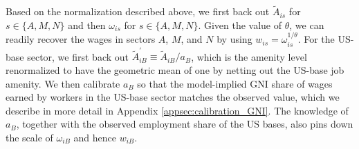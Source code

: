 \documentclass[12pt, unicode, a4paper]{article}
\newcommand{\1}{\mbox{1}\hspace{-0.25em}\mbox{l}} %
\begin{document}
Based on the normalization described above, we first back out $\widetilde{A}_{is}$ for $s \in \{ A,M,N \}$ and then $\omega_{is}$ for $s \in \{ A,M,N \}$. Given the value of $\theta$, we can readily recover the wages in sectors $A$, $M$, and $N$ by using $w_{is} = \omega_{is}^{1/\theta}$.
For the US-base sector, we first back out  $\widetilde{A}_{iB}^\prime \equiv \widetilde{A}_{iB}/a_B$, which is the amenity level renormalized to have the geometric mean of one by netting out the US-base job amenity. We then calibrate $a_B$ so that the model-implied GNI share of wages earned by workers in the US-base sector matches the observed value, which we describe in more detail in Appendix \ref{appsec:calibration_GNI}. 
The knowledge of $a_B$, together with the observed employment share of the US bases, also pins down the scale of $\omega_{iB}$ and hence $w_{iB}$. 


\end{document}
